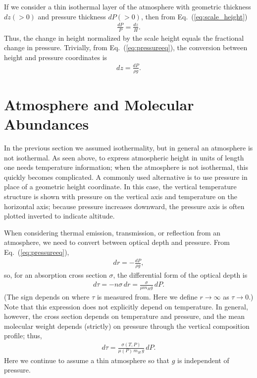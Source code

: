 If we consider a thin isothermal layer of the atmosphere with geometric thickness $d z (> 0)$ and pressure thickness $d P (>0)$, then from Eq.~(\ref{eq:scale_height})
\begin{eqnarray}
\label{eq:conversion_z_P}
\frac{d P}{P} = \frac{d z}{H} .
\end{eqnarray}
Thus, the change in height normalized by the scale height equals the fractional change in pressure. Trivially, from Eq.~(\ref{eq:pressureeq}), the conversion between height and pressure coordinates is
\begin{eqnarray}
\label{eq:pressureeq_}
d z = \frac{d P}{\rho g} .
\end{eqnarray}

\section{Atmosphere and Molecular Abundances}

In the previous section we assumed isothermality, but in general an atmosphere is not isothermal. As seen above, to express atmospheric height in units of length one needs temperature information; when the atmosphere is not isothermal, this quickly becomes complicated. A commonly used alternative is to use pressure in place of a geometric height coordinate. In this case, the vertical temperature structure is shown with pressure on the vertical axis and temperature on the horizontal axis; because pressure increases downward, the pressure axis is often plotted inverted to indicate altitude.

When considering thermal emission, transmission, or reflection from an atmosphere, we need to convert between optical depth and pressure. From Eq.~(\ref{eq:pressureeq}),
\begin{eqnarray}
\label{eq:drdp}
d r = - \frac{d P}{\rho g} ,
\end{eqnarray}
so, for an absorption cross section $\sigma$, the differential form of the optical depth is
\begin{eqnarray}
d \tau = - n \sigma \, d r = \frac{\sigma}{\mu m_H g}\, d P .
\end{eqnarray}
(The sign depends on where $\tau$ is measured from. Here we define $r \to \infty$ as $\tau \to 0$.) Note that this expression does not explicitly depend on temperature. In general, however, the cross section depends on temperature and pressure, and the mean molecular weight depends (strictly) on pressure through the vertical composition profile; thus,
\begin{eqnarray}
\label{eq:dtaudP}
d \tau = \frac{\sigma(T,P)}{\mu (P)\, m_H \, g}\, d P .
\end{eqnarray}
Here we continue to assume a thin atmosphere so that $g$ is independent of pressure.\\

